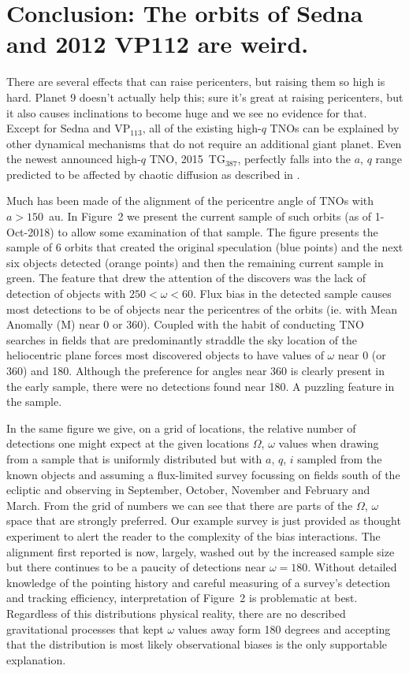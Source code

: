 \documentclass{aastex62}
\begin{document}
\section{Conclusion: The orbits of Sedna and 2012 VP112 are weird.}

There are several effects that can raise pericenters, but raising them
so high is hard.  Planet 9 doesn't actually help this; sure it's great
at raising pericenters, but it also causes inclinations to become huge
and we see no evidence for that.  Except for Sedna and VP$_{113}$, all
of the existing high-$q$ TNOs can be explained by other dynamical
mechanisms that do not require an additional giant planet.  Even the
newest announced high-$q$ TNO, 2015~TG$_{387}$, perfectly falls into
the $a$, $q$ range predicted to be affected by chaotic diffusion as
described in \citet{bannister17}.

Much has been made of the alignment of the pericentre angle of TNOs
with $a>150$~au.  In Figure~2 we present the current sample of such
orbits (as of 1-Oct-2018) to allow some examination of that sample.
The figure presents the sample of 6 orbits that created the original
speculation (blue points) and the next six objects detected (orange
points) and then the remaining current sample in green.  The feature
that drew the attention of the discovers was the lack of detection of
objects with $250< \omega < 60$.  Flux bias in the detected sample
causes most detections to be of objects near the pericentres of the
orbits (ie. with Mean Anomally (M) near 0 or 360).  Coupled with the
habit of conducting TNO searches in fields that are predominantly
straddle the sky location of the heliocentric plane forces most
discovered objects to have values of $\omega$ near 0 (or 360) and 180.
Although the preference for angles near 360 is clearly present in the
early sample, there were no detections found near 180.  A puzzling
feature in the sample.

In the same figure we give, on a grid of locations, the relative
number of detections one might expect at the given locations $\Omega$,
$\omega$ values when drawing from a sample that is uniformly
distributed but with $a$, $q$, $i$ sampled from the known objects and
assuming a flux-limited survey focussing on fields south of the
ecliptic and observing in September, October, November and February
and March.  From the grid of numbers we can see that there are parts
of the $\Omega$, $\omega$ space that are strongly preferred.  Our
example survey is just provided as thought experiment to alert the
reader to the complexity of the bias interactions. The alignment first
reported is now, largely, washed out by the increased sample size but
there continues to be a paucity of detections near $\omega = 180$.
Without detailed knowledge of the pointing history and careful
measuring of a survey's detection and tracking efficiency,
interpretation of Figure~2 is problematic at best.  Regardless of this
distributions physical reality, there are no described gravitational
processes that kept $\omega$ values away form 180 degrees and
accepting that the distribution is most likely observational biases is
the only supportable explanation.
\end{document}
